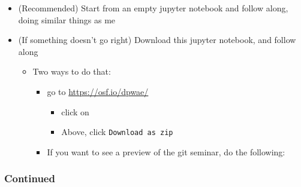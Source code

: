 \documentclass[10pt,parskip=half,
	toc=sectionentrywithdots,
	bibliography=totocnumbered,
	captions=tableheading,numbers=noendperiod]{scrartcl}
\providecommand{\tightlist}{%
  \setlength{\itemsep}{0pt}\setlength{\parskip}{0pt}}
\begin{document}
\begin{itemize}
\tightlist
\item
  (Recommended) Start from an empty jupyter notebook and follow along,
  doing similar things as me
\item
  (If something doesn't go right) Download this jupyter notebook, and
  follow along

  \begin{itemize}
  \tightlist
  \item
    Two ways to do that:

    \begin{itemize}
    \tightlist
    \item
      go to \url{https://osf.io/dpwae/}

      \begin{itemize}
      \tightlist
      \item
        click on 
      \item
        Above, click \texttt{Download\ as\ zip}
      \end{itemize}
    \item
      If you want to see a preview of the git seminar, do the following:
    \end{itemize}
  \end{itemize}
\end{itemize}

\hypertarget{continued}{%
\subsubsection{Continued}\label{continued}}
\end{document}
